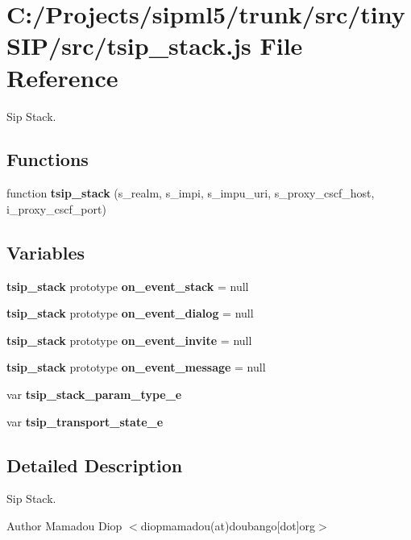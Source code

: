 \section{C\-:/\-Projects/sipml5/trunk/src/tiny\-S\-I\-P/src/tsip\-\_\-stack.js File Reference}
\label{tsip__stack_8js}


Sip Stack.  


\subsection*{Functions}
\begin{DoxyCompactItemize}
\item 
function {\bf tsip\-\_\-stack} (s\-\_\-realm, s\-\_\-impi, s\-\_\-impu\-\_\-uri, s\-\_\-proxy\-\_\-cscf\-\_\-host, i\-\_\-proxy\-\_\-cscf\-\_\-port)
\end{DoxyCompactItemize}
\subsection*{Variables}
\begin{DoxyCompactItemize}
\item 
{\bf tsip\-\_\-stack} prototype {\bfseries on\-\_\-event\-\_\-stack} = null\label{tsip__stack_8js_ae19e1096a345e0aa87fe7c8a264af686}

\item 
{\bf tsip\-\_\-stack} prototype {\bfseries on\-\_\-event\-\_\-dialog} = null\label{tsip__stack_8js_a28724b6c4d6a0048bdcb79e4a6925a93}

\item 
{\bf tsip\-\_\-stack} prototype {\bfseries on\-\_\-event\-\_\-invite} = null\label{tsip__stack_8js_a1e64f540f7e8aceb3f67a41e95c0a31e}

\item 
{\bf tsip\-\_\-stack} prototype {\bfseries on\-\_\-event\-\_\-message} = null\label{tsip__stack_8js_a5e03e908498888fdcf4810e08713ff80}

\item 
var {\bfseries tsip\-\_\-stack\-\_\-param\-\_\-type\-\_\-e}\label{tsip__stack_8js_a29a36403a142c66ad1dcb37c78be6ef7}

\item 
var {\bfseries tsip\-\_\-transport\-\_\-state\-\_\-e}
\end{DoxyCompactItemize}


\subsection{Detailed Description}
Sip Stack. \begin{DoxyAuthor}{Author}
Mamadou Diop $<$diopmamadou(at)doubango[dot]org$>$ 
\end{DoxyAuthor}


